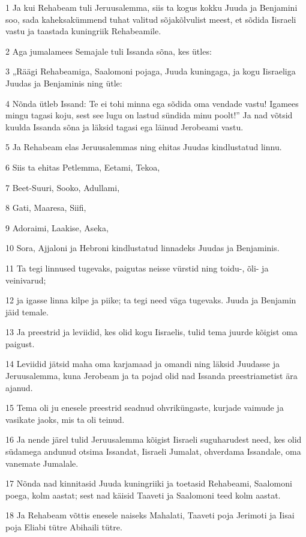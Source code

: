 \par 1 Ja kui Rehabeam tuli Jeruusalemma, siis ta kogus kokku Juuda ja Benjamini soo, sada kaheksakümmend tuhat valitud sõjakõlvulist meest, et sõdida Iisraeli vastu ja taastada kuningriik Rehabeamile.
\par 2 Aga jumalamees Semajale tuli Issanda sõna, kes ütles:
\par 3 „Räägi Rehabeamiga, Saalomoni pojaga, Juuda kuningaga, ja kogu Iisraeliga Juudas ja Benjaminis ning ütle:
\par 4 Nõnda ütleb Issand: Te ei tohi minna ega sõdida oma vendade vastu! Igamees mingu tagasi koju, sest see lugu on lastud sündida minu poolt!” Ja nad võtsid kuulda Issanda sõna ja läksid tagasi ega läinud Jerobeami vastu.
\par 5 Ja Rehabeam elas Jeruusalemmas ning ehitas Juudas kindlustatud linnu.
\par 6 Siis ta ehitas Petlemma, Eetami, Tekoa,
\par 7 Beet-Suuri, Sooko, Adullami,
\par 8 Gati, Maaresa, Siifi,
\par 9 Adoraimi, Laakise, Aseka,
\par 10 Sora, Ajjaloni ja Hebroni kindlustatud linnadeks Juudas ja Benjaminis.
\par 11 Ta tegi linnused tugevaks, paigutas neisse vürstid ning toidu-, õli- ja veinivarud;
\par 12 ja igasse linna kilpe ja piike; ta tegi need väga tugevaks. Juuda ja Benjamin jäid temale.
\par 13 Ja preestrid ja leviidid, kes olid kogu Iisraelis, tulid tema juurde kõigist oma paigust.
\par 14 Leviidid jätsid maha oma karjamaad ja omandi ning läksid Juudasse ja Jeruusalemma, kuna Jerobeam ja ta pojad olid nad Issanda preestriametist ära ajanud.
\par 15 Tema oli ju enesele preestrid seadnud ohvriküngaste, kurjade vaimude ja vasikate jaoks, mis ta oli teinud.
\par 16 Ja nende järel tulid Jeruusalemma kõigist Iisraeli suguharudest need, kes olid südamega andunud otsima Issandat, Iisraeli Jumalat, ohverdama Issandale, oma vanemate Jumalale.
\par 17 Nõnda nad kinnitasid Juuda kuningriiki ja toetasid Rehabeami, Saalomoni poega, kolm aastat; sest nad käisid Taaveti ja Saalomoni teed kolm aastat.
\par 18 Ja Rehabeam võttis enesele naiseks Mahalati, Taaveti poja Jerimoti ja Iisai poja Eliabi tütre Abihaili tütre.
